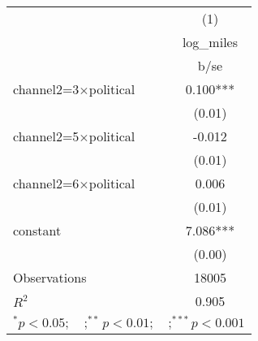 \begin{tabular}{l*{1}{c}}
\toprule
                    &\multicolumn{1}{c}{(1)}\\
                    &\multicolumn{1}{c}{log\_miles}\\
                    &        b/se   \\
\midrule
channel2=3$\times$political&       0.100***\\
                    &      (0.01)   \\
channel2=5$\times$political&      -0.012   \\
                    &      (0.01)   \\
channel2=6$\times$political&       0.006   \\
                    &      (0.01)   \\
constant            &       7.086***\\
                    &      (0.00)   \\
\midrule
Observations        &       18005   \\
\(R^{2}\)           &       0.905   \\
\bottomrule
\multicolumn{2}{l}{\footnotesize $^{*}p<0.05; \quad ; ^{**} p<0.01; \quad ; ^{***}p<0.001$}\\
\end{tabular}

